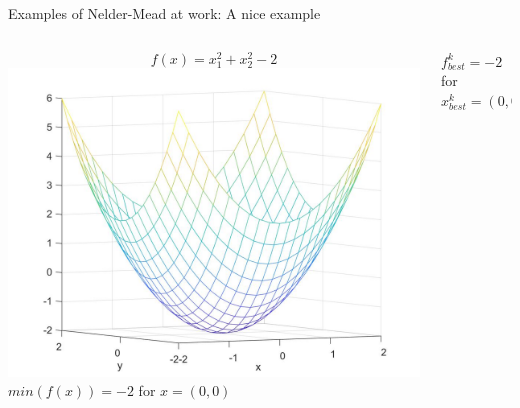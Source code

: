 \documentclass{beamer}
\begin{document}
\begin{frame}{Examples of Nelder-Mead at work: A nice example}
\begin{columns}
\begin{column}{0.49\linewidth}
	$$f(x) = x_1^2 + x_2^2 - 2$$
	\includegraphics[width=0.95\linewidth]{NiceFunctionPlot}	\\
	$min(f(x))=-2$ for $x=(0,0)$
\end{column}
\begin{column}{0.49\linewidth}
	\begin{figure}
	\end{figure}	
	$f^k_{best}=-2$ for $x^k_{best}=(0,0)$
\end{column}
\end{columns}
\end{frame}
\end{document}
